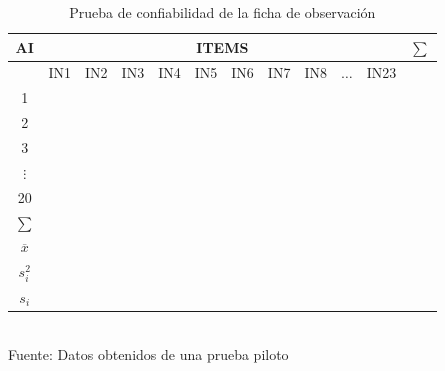 \documentclass[12pt,a4paper]{article}
\begin{document}
\begin{table}[ht!]
	{%
		\caption{Prueba de confiabilidad de la ficha de observación}\label{pret:1}
		\begin{tabular}{|c|c|c|c|c|c|c|c|c|c|c|c|}\hline
			AI             & \multicolumn{10}{c}{ITEMS} & $\sum$                                                         \\\hline
			               & IN1                        & IN2    & IN3 & IN4 & IN5 & IN6 & IN7 & IN8 & $\ldots$ & IN23 & \\\hline
			1              &                            &        &     &     &     &     &     &     &          &      & \\\hline
			2              &                            &        &     &     &     &     &     &     &          &      & \\\hline
			3              &                            &        &     &     &     &     &     &     &          &      & \\\hline
			$\vdots$       &                            &        &     &     &     &     &     &     &          &      & \\\hline
			20             &                            &        &     &     &     &     &     &     &          &      & \\\hline
			$\sum$         &                            &        &     &     &     &     &     &     &          &      & \\\hline
			$\overline{x}$ &                            &        &     &     &     &     &     &     &          &      & \\\hline
			$s_i^2$        &                            &        &     &     &     &     &     &     &          &      & \\\hline
			$s_i$          &                            &        &     &     &     &     &     &     &          &      & \\\hline
		\end{tabular}\\\vspace{0.5cm}
		{\normalsize Fuente: Datos obtenidos de una prueba piloto}
	}
\end{table}


\end{document}
